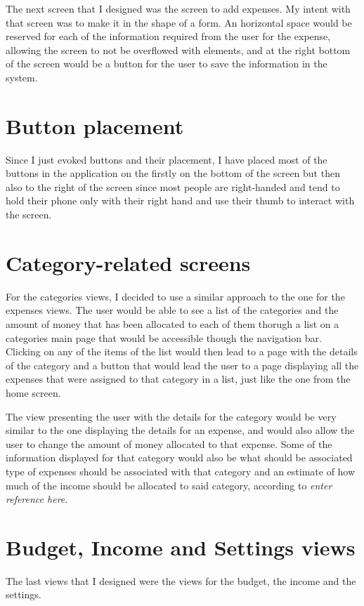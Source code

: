 The next screen that I designed was the screen to add expenses. My intent with that screen was to make it in the shape of a form. An horizontal space would be reserved for each of the information required from the user for the expense, allowing the screen to not be overflowed with elements, and at the right bottom of the screen would be a button for the user to save the information in the system.

\section{Button placement}
Since I just evoked buttons and their placement, I have placed most of the buttons in the application on the firstly on the bottom of the screen but then also to the right of the screen since most people are right-handed and tend to hold their phone only with their right hand and use their thumb to interact with the screen.

\section{Category-related screens}
For the categories views, I decided to use a similar approach to the one for the expenses views. The user would be able to see a list of the categories and the amount of money that has been allocated to each of them thorugh a list on a categories main page that would be accessible though the navigation bar. Clicking on any of the items of the list would then lead to a page with the details of the category and a button that would lead the user to a page displaying all the expenses that were assigned to that category in a list, just like the one from the home screen.

The view presenting the user with the details for the category would be very similar to the one displaying the details for an expense, and would also allow the user to change the amount of money allocated to that expense. Some of the information displayed for that category would also be what should be associated type of expenses should be associated with that category and an estimate of how much of the income should be allocated to said category, according to \emph{enter reference here}.


\section{Budget, Income and Settings views}
The last views that I designed were the views for the budget, the income and the settings.

